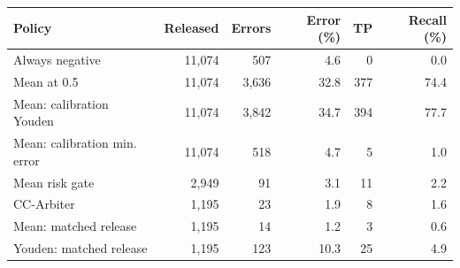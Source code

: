 \begin{tabular}{lrrrrr}\toprule
Policy & Released & Errors & Error (\%) & TP & Recall (\%)\\\midrule
Always negative & 11,074 & 507 & 4.6 & 0 & 0.0 \\
Mean at 0.5 & 11,074 & 3,636 & 32.8 & 377 & 74.4 \\
Mean: calibration Youden & 11,074 & 3,842 & 34.7 & 394 & 77.7 \\
Mean: calibration min. error & 11,074 & 518 & 4.7 & 5 & 1.0 \\
Mean risk gate & 2,949 & 91 & 3.1 & 11 & 2.2 \\
CC-Arbiter & 1,195 & 23 & 1.9 & 8 & 1.6 \\
Mean: matched release & 1,195 & 14 & 1.2 & 3 & 0.6 \\
Youden: matched release & 1,195 & 123 & 10.3 & 25 & 4.9 \\
\bottomrule\end{tabular}
